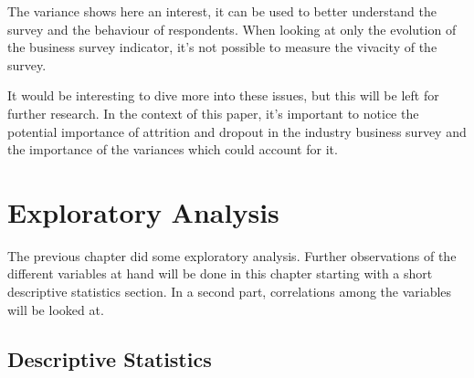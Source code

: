 \documentclass[12pt,a4paper,oneside]{book}
\begin{document}
The variance shows here an interest, it can be used to better understand the survey and the behaviour of respondents.
When looking at only the evolution of the business survey indicator, it's not possible to measure the vivacity of the survey.

It would be interesting to dive more into these issues, but this will be left for further research. 
In the context of this paper, it's important to notice the potential importance of attrition and dropout in the industry business survey and the importance of the variances which could account for it.



\chapter{Exploratory Analysis}

The previous chapter did some exploratory analysis.
Further observations of the different variables at hand will be done in this chapter starting with a short descriptive statistics section.
In a second part, correlations among the variables will be looked at.


\section{Descriptive Statistics}
\end{document}
